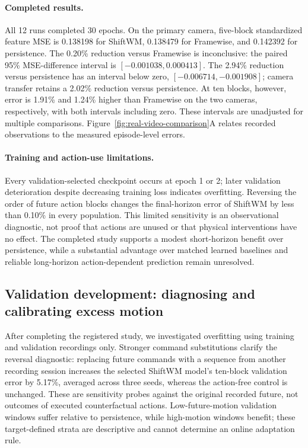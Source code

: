 
\paragraph{Completed results.}
All 12 runs completed 30 epochs. On the primary camera, five-block
standardized feature MSE is 0.138198 for ShiftWM, 0.138479 for Framewise,
and 0.142392 for persistence. The 0.20\% reduction versus Framewise is
inconclusive: the paired 95\% MSE-difference interval is
$[-0.001038,0.000413]$. The 2.94\% reduction versus persistence has an
interval below zero, $[-0.006714,-0.001908]$; camera transfer retains a
2.02\% reduction versus persistence. At ten blocks, however, error is
1.91\% and 1.24\% higher than Framewise on the two cameras, respectively,
with both intervals including zero. These intervals are unadjusted for
multiple comparisons. Figure~\ref{fig:real-video-comparison}A relates
recorded observations to the measured episode-level errors.

\paragraph{Training and action-use limitations.}
Every validation-selected checkpoint occurs at epoch 1 or 2; later
validation deterioration despite decreasing training loss indicates
overfitting. Reversing the order of future action blocks changes the
final-horizon error of ShiftWM by less than 0.10\% in every population.
This limited sensitivity is an observational diagnostic, not proof that
actions are unused or that physical interventions have no effect.
The completed study supports a modest short-horizon benefit over
persistence, while a substantial advantage over matched learned baselines
and reliable long-horizon action-dependent prediction remain unresolved.

\subsection{Validation development: diagnosing and calibrating excess motion}
\label{app:real-video-calibration-development}
After completing the registered study, we investigated overfitting using
training and validation recordings only. Stronger command substitutions
clarify the reversal diagnostic: replacing future commands with a sequence
from another recording session increases the selected ShiftWM model's
ten-block validation error by 5.17\%, averaged across three seeds, whereas
the action-free control is unchanged. These are sensitivity probes against
the original recorded future, not outcomes of executed counterfactual actions.
Low-future-motion validation windows suffer relative to persistence, while
high-motion windows benefit; these target-defined strata are descriptive
and cannot determine an online adaptation rule.

